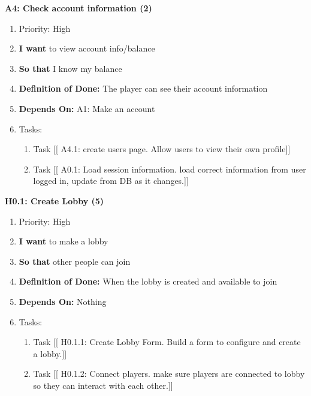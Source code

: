 \textbf{A4: Check account information (2)}
\begin{enumerate}
    \item Priority: High
    \item \textbf{I want} to view account info/balance
    \item \textbf{So that} I know my balance
    \item \textbf{Definition of Done:} The player can see their account information
    \item \textbf{Depends On:} A1: Make an account
    \item Tasks:
    \begin{enumerate}
        \item Task [[ A4.1: create users page. Allow users to view their own profile]]
        \item Task [[ A0.1: Load session information. load correct information from user logged in, update from DB as it changes.]]
    \end{enumerate}
\end{enumerate}

\vspace{2em}

\textbf{H0.1: Create Lobby (5)}
\begin{enumerate}
    \item Priority: High
    \item \textbf{I want} to make a lobby
    \item \textbf{So that} other people can join
    \item \textbf{Definition of Done:} When the lobby is created and available to join
    \item \textbf{Depends On:} Nothing
    \item Tasks:
    \begin{enumerate}
        \item Task [[ H0.1.1: Create Lobby Form. Build a form to configure and create a lobby.]]
        \item Task [[ H0.1.2: Connect players. make sure players are connected to lobby so they can interact with each other.]]
    \end{enumerate}
\end{enumerate}

\vspace{2em}

